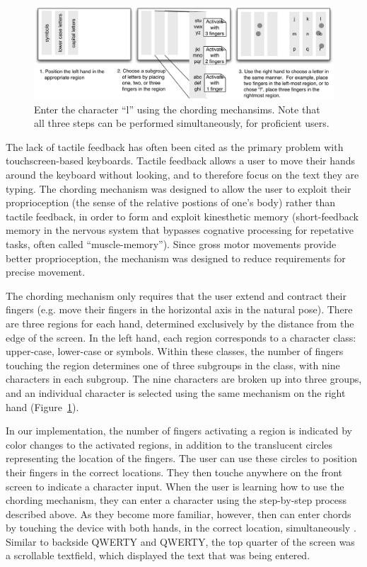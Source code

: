 \begin{figure}
    \includegraphics[width=\textwidth]{Figures/chording_explaination.pdf} 
    \caption{Enter the character ``l'' using the chording mechansims.
      Note that all three steps can be performed simultaneously, for
      proficient users.}
    \label{fig:chording_explaination}
\end{figure} 

The lack of tactile feedback has often been cited as the primary
problem with touchscreen-based keyboards.  Tactile feedback allows a
user to move their hands around the keyboard without looking, and to
therefore focus on the text they are typing.  The chording mechanism
was designed to allow the user to exploit their proprioception (the
sense of the relative postions of one's body) rather than tactile
feedback, in order to form and exploit kinesthetic memory
(short-feedback memory in the nervous system that bypasses cognative
processing for repetative tasks, often called ``muscle-memory'').
Since gross motor movements provide better proprioception, the
mechanism was designed to reduce requirements for precise movement.

The chording mechanism only requires that the user extend and contract
their fingers (e.g. move their fingers in the horizontal axis in the
natural pose).  There are three regions for each hand, determined
exclusively by the distance from the edge of the screen.  In the left
hand, each region corresponds to a character class: upper-case,
lower-case or symbols.  Within these classes, the number of fingers
touching the region determines one of three subgroups in the class,
with nine characters in each subgroup.  The nine characters are broken
up into three groups, and an individual character is selected using
the same mechanism on the right hand
(Figure~\ref{fig:chording_explaination}).

In our implementation, the number of fingers activating a region is
indicated by color changes to the activated regions, in addition to
the translucent circles representing the location of the fingers.
The user can use these circles to position their fingers in the correct
locations.  They then touche anywhere on the front screen to
indicate a character input.  When the user is learning how to use the
chording mechanism, they can enter a character using the step-by-step
process described above.  As they become more familiar, however, then
can enter chords by touching the device with both hands, in the
correct location, simultaneously
.
Similar to backside QWERTY and QWERTY, the top quarter of the screen
was a scrollable textfield, which displayed the text that was being
entered.

